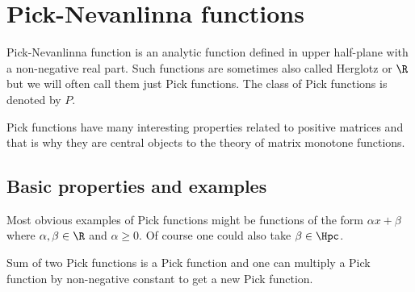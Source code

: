 \chapter{Pick-Nevanlinna functions}

Pick-Nevanlinna function is an analytic function defined in upper half-plane with a non-negative real part. Such functions are sometimes also called Herglotz or $\R$ but we will often call them just Pick functions. The class of Pick functions is denoted by $P$.

Pick functions have many interesting properties related to positive matrices and that is why they are central objects to the theory of matrix monotone functions.

\section{Basic properties and examples}

Most obvious examples of Pick functions might be functions of the form $\alpha x + \beta$ where $\alpha, \beta \in \R$ and $\alpha \geq 0$. Of course one could also take $\beta \in \Hpc$.

Sum of two Pick functions is a Pick function and one can multiply a Pick function by non-negative constant to get a new Pick function.